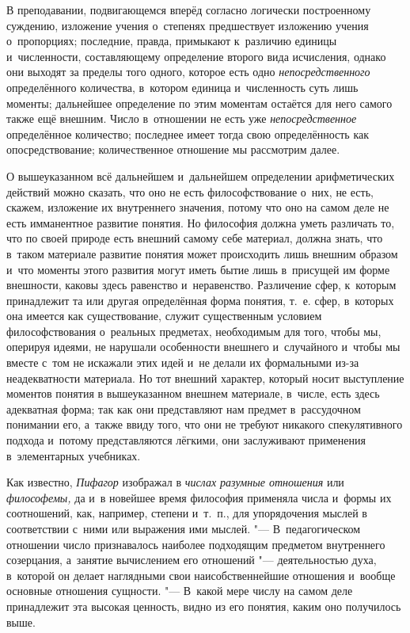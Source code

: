 В преподавании, подвигающемся вперёд согласно логически построенному суждению,
изложение учения о~степенях предшествует изложению учения о~пропорциях;
последние, правда, примыкают к~различию единицы и~численности, составляющему
определение второго вида исчисления, однако они выходят за пределы того одного,
которое есть одно {\em непосредственного} определённого количества, в~котором
единица и~численность суть лишь моменты; дальнейшее определение по этим
моментам остаётся для него самого также ещё внешним. Число в~отношении не
есть уже {\em непосредственное} определённое количество; последнее имеет тогда
свою определённость как опосредствование; количественное отношение мы
рассмотрим далее.

О вышеуказанном всё дальнейшем и~дальнейшем определении арифметических действий
можно сказать, что оно не есть философствование о~них, не есть, скажем,
изложение их внутреннего значения, потому что оно на самом деле не есть
имманентное развитие понятия. Но философия должна уметь различать то, что по
своей природе есть внешний самому себе материал, должна знать, что в~таком
материале развитие понятия может происходить лишь внешним
образом и~что моменты этого развития могут иметь бытие лишь в~присущей
им форме внешности, каковы здесь равенство и~неравенство. Различение
сфер, к~которым принадлежит та или другая определённая форма понятия, т.~е.
сфер, в~которых она имеется как существование, служит существенным условием
философствования о~реальных предметах, необходимым для того, чтобы мы, оперируя идеями, не
нарушали особенности внешнего и~случайного и~чтобы мы вместе с~том не искажали
этих идей и~не делали их формальными из-за неадекватности материала.
Но тот внешний характер, который носит выступление моментов понятия в
вышеуказанном внешнем материале, в~числе, есть здесь адекватная форма; так
как они представляют нам предмет в~рассудочном понимании его, а~также ввиду того, что
они не требуют никакого спекулятивного подхода и~потому представляются лёгкими,
они заслуживают применения в~элементарных учебниках.


Как известно, {\em Пифагор} изображал в {\em числах разумные отношения} или
{\em философемы,} да и~в новейшее время философия применяла числа и~формы их
соотношений, как, например, степени и~т.~п., для упорядочения мыслей в
соответствии с~ними или выражения ими мыслей. "--- В~педагогическом отношении число признавалось
наиболее подходящим предметом внутреннего созерцания, а~занятие вычислением его
отношений "--- деятельностью духа, в~которой он делает наглядными свои
наисобственнейшие отношения и~вообще основные отношения сущности. "--- В~какой
мере числу на самом деле принадлежит эта высокая ценность, видно из его
понятия, каким оно получилось выше.

